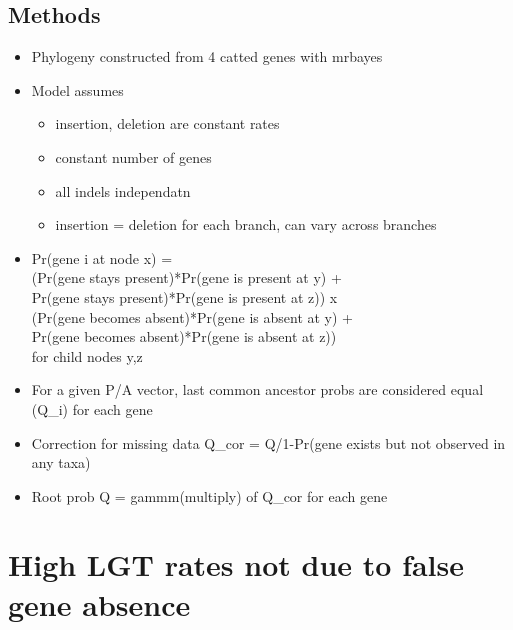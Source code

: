 \documentclass[10pt,letter]{article}
\begin{document}
\subsection*{Methods}
\begin{itemize}
    \item Phylogeny constructed from 4 catted genes with mrbayes
    \item Model assumes
    \begin{itemize}
        \item insertion, deletion are constant rates
        \item constant number of genes
        \item all indels independatn
        \item insertion = deletion for each branch, can vary across branches
    \end{itemize}
    \item Pr(gene i at node x) =\\
            (Pr(gene stays present)*Pr(gene is present at y) +\\
            Pr(gene stays present)*Pr(gene is present at z)) x\\
            (Pr(gene becomes absent)*Pr(gene is absent at y) +\\
            Pr(gene becomes absent)*Pr(gene is absent at z))\\
            for child nodes y,z
    \item For a given P/A vector, last common ancestor probs are considered equal (Q_i) for each gene
    \item Correction for missing data Q_cor = Q/1-Pr(gene exists but not observed in any taxa)
    \item Root prob Q = gammm(multiply) of Q_cor for each gene
\end{itemize}
\section*{High LGT rates not due to false gene absence\cite{unrate}}
\end{document}
